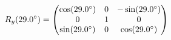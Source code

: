 \documentclass[preview]{standalone}
\begin{document}
\begin{align*}
\special{dvisvgm:raw <g id='unique000'>}R_y(29.0^\circ) = \begin{pmatrix} \cos(29.0^\circ) & 0 & -\sin(29.0^\circ) \\ 0 & 1 & 0 \\ \sin(29.0^\circ) & 0 & \cos(29.0^\circ) \end{pmatrix}\special{dvisvgm:raw </g>}
\end{align*}
\end{document}
